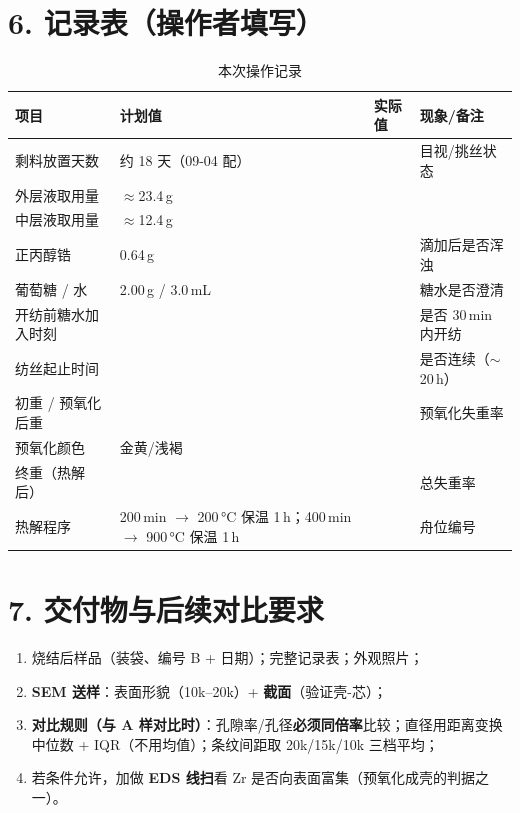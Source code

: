 \documentclass[a4paper, 11pt]{ctexart}
\begin{document}
\section*{6. 记录表（操作者填写）}
\begin{table}[htbp]
\centering
\caption{本次操作记录}
\begin{tabularx}{\textwidth}{l l l X}
\toprule
项目 & 计划值 & 实际值 & 现象/备注 \\
\midrule
剩料放置天数 & 约 18 天（09-04 配） & & 目视/挑丝状态 \\
外层液取用量 & $\approx$23.4\,g & & \\
中层液取用量 & $\approx$12.4\,g & & \\
正丙醇锆 & 0.64\,g & & 滴加后是否浑浊 \\
葡萄糖 / 水 & 2.00\,g / 3.0\,mL & & 糖水是否澄清 \\
开纺前糖水加入时刻 & & & 是否 30\,min 内开纺 \\
纺丝起止时间 & & & 是否连续（$\sim$20\,h）\\
初重 / 预氧化后重 & & & 预氧化失重率 \\
预氧化颜色 & 金黄/浅褐 & & \\
终重（热解后） & & & 总失重率 \\
热解程序 & 200\,min $\rightarrow$ 200\,°C 保温 1\,h；400\,min $\rightarrow$ 900\,°C 保温 1\,h & & 舟位编号 \\
\bottomrule
\end{tabularx}
\end{table}

\section*{7. 交付物与后续对比要求}
\begin{enumerate}
  \item 烧结后样品（装袋、编号 B + 日期）；完整记录表；外观照片；
  \item \textbf{SEM 送样}：表面形貌（10k--20k）+ \textbf{截面}（验证壳-芯）；
  \item \textbf{对比规则（与 A 样对比时）}：孔隙率/孔径\textbf{必须同倍率}比较；直径用距离变换中位数 + IQR（不用均值）；条纹间距取 20k/15k/10k 三档平均；
  \item 若条件允许，加做 \textbf{EDS 线扫}看 Zr 是否向表面富集（预氧化成壳的判据之一）。
\end{enumerate}
\end{document}

